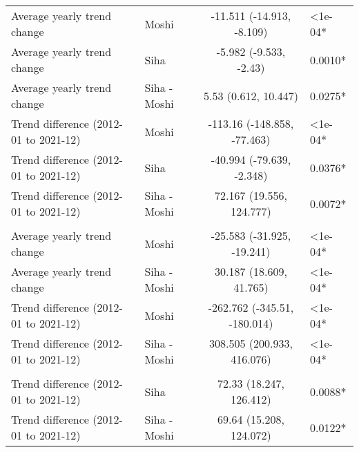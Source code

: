 \begin{longtable}{l|lcl}
\midrule\addlinespace[2.5pt]
Average yearly trend change & Moshi & -11.511 (-14.913, -8.109) & <1e-04* \\ 
Average yearly trend change & Siha & -5.982 (-9.533, -2.43) & 0.0010* \\ 
Average yearly trend change & Siha - Moshi & 5.53 (0.612, 10.447) & 0.0275* \\ 
Trend difference (2012-01 to 2021-12) & Moshi & -113.16 (-148.858, -77.463) & <1e-04* \\ 
Trend difference (2012-01 to 2021-12) & Siha & -40.994 (-79.639, -2.348) & 0.0376* \\ 
Trend difference (2012-01 to 2021-12) & Siha - Moshi & 72.167 (19.556, 124.777) & 0.0072* \\ 
\midrule\addlinespace[2.5pt]
\multicolumn{4}{l}{Other Communicable Diseases} \\[2.5pt] 
\midrule\addlinespace[2.5pt]
Average yearly trend change & Moshi & -25.583 (-31.925, -19.241) & <1e-04* \\ 
Average yearly trend change & Siha - Moshi & 30.187 (18.609, 41.765) & <1e-04* \\ 
Trend difference (2012-01 to 2021-12) & Moshi & -262.762 (-345.51, -180.014) & <1e-04* \\ 
Trend difference (2012-01 to 2021-12) & Siha - Moshi & 308.505 (200.933, 416.076) & <1e-04* \\ 
\midrule\addlinespace[2.5pt]
\multicolumn{4}{l}{Cancer} \\[2.5pt] 
\midrule\addlinespace[2.5pt]
Trend difference (2012-01 to 2021-12) & Siha & 72.33 (18.247, 126.412) & 0.0088* \\ 
Trend difference (2012-01 to 2021-12) & Siha - Moshi & 69.64 (15.208, 124.072) & 0.0122* \\ 
\bottomrule
\end{longtable}
\endgroup

